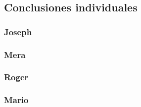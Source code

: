 \subsection{Conclusiones individuales}
\subsubsection{Joseph}

\subsubsection{Mera}

\subsubsection{Roger}

\subsubsection{Mario}

